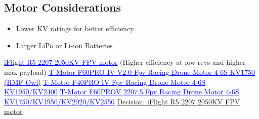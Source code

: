 	\subsection{Motor Considerations}
		\begin{itemize}
			\item Lower KV ratings for better efficiency
			\item Larger LiPo or Li-ion Batteries
		\end{itemize}
	\href{https://shop.iflight.com/R5-2207-2050KV-FPV-motor-Pro2029?search=R5%202207}{\textcolor{blue}{\underline{iFlight R5 2207 2050KV FPV motor}}} (Higher efficiency at low revs and higher max payload)\newline
	\href{https://store.tmotor.com/product/F60pro4-v2-kv1750-fpv-motor.html}{\textcolor{blue}{\underline{T-Motor F60PRO IV V2.0 Fpv Racing Drone Motor 4-6S KV1750 (RMF-Owl)}}}\newline
	\href{https://store.tmotor.com/product/f40pro-4-fpv-motor.html}{\textcolor{blue}{\underline{T-Motor F40PRO IV Fpv Racing Drone Motor 4-6S KV1950/KV2400}}}\newline
	\href{https://store.tmotor.com/product/f60prov-fpv-motor.html}{\textcolor{blue}{\underline{T-Motor F60PROV 2207.5 Fpv Racing Drone Motor 4-6S KV1750/KV1950/KV2020/KV2550}}}\newline
	\newline
	\underline{Decision: iFlight R5 2207 2050KV FPV motor}

